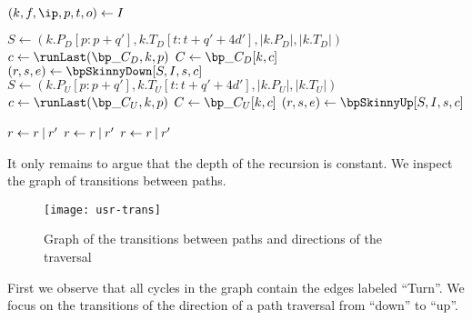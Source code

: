 \begin{algorithm}
\begin{algorithmic}
 
	\State $(k, f, \ip, p, t, o) \gets I$
	
	 
		\State $S \gets (k.P_D[p:p+q'], k.T_D[t:t + q' + 4d'], |k.P_D|, |k.T_D|)$
		\State $c \gets \runLast(\bp\_C_D, k, p)$%
		\Instr $C \gets \bp\_C_D[k, c]$
		\State $(r, s, e) \gets \bpSkinnyDown[S, I, s, c]$
	 
		\State $S \gets (k.P_U[p:p+q'], k.T_U[t:t + q' + 4d'], |k.P_U|, |k.T_U|)$
		\State $c \gets \runLast(\bp\_C_U, k, p)$%
		\Instr $C \gets \bp\_C_U[k, c]$
		\State $(r, s, e) \gets \bpSkinnyUp[S, I, s, c]$
	\EndIf
	
	 
		\State $r \gets r \mathbin{|} r'$
	 
		\State $r \gets r \mathbin{|} r'$
	 
		\State $r \gets r \mathbin{|} r'$
	\EndIf
	
	\State {}
\EndFunction
\end{algorithmic}
\end{algorithm}

\bigbreak

It only remains to argue that the depth of the recursion is constant.
We inspect the graph of transitions between paths.

\begin{figure}[h]
	\centering
	\texttt{[image: usr-trans]}
	\caption{Graph of the transitions between paths and directions of the traversal}
\end{figure}

First we observe that all cycles in the graph contain the edges labeled ``Turn''.
We focus on the transitions of the direction of a path traversal from ``down'' to ``up''.

